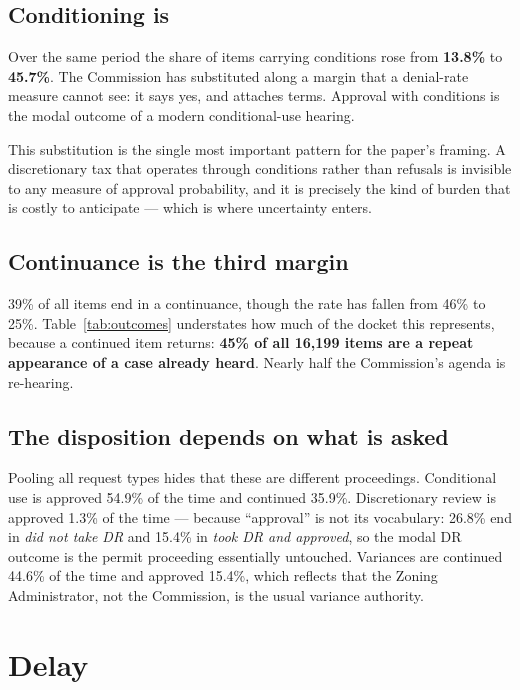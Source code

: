 \documentclass[11pt]{article}
\begin{document}
\subsection{Conditioning is}

Over the same period the share of items carrying conditions rose from \textbf{13.8\%} to
\textbf{45.7\%}. The Commission has substituted along a margin that a denial-rate measure
cannot see: it says yes, and attaches terms. Approval with conditions is the modal outcome of
a modern conditional-use hearing.

This substitution is the single most important pattern for the paper's framing. A discretionary
tax that operates through conditions rather than refusals is invisible to any measure of
approval probability, and it is precisely the kind of burden that is costly to anticipate ---
which is where uncertainty enters.

\subsection{Continuance is the third margin}

39\% of all items end in a continuance, though the rate has fallen from 46\% to 25\%.
Table~\ref{tab:outcomes} understates how much of the docket this represents, because a
continued item returns: \textbf{45\% of all 16{,}199 items are a repeat appearance of a case
already heard}. Nearly half the Commission's agenda is re-hearing.

\subsection{The disposition depends on what is asked}

Pooling all request types hides that these are different proceedings. Conditional use is
approved 54.9\% of the time and continued 35.9\%. Discretionary review is approved 1.3\% of
the time --- because ``approval'' is not its vocabulary: 26.8\% end in \emph{did not take DR}
and 15.4\% in \emph{took DR and approved}, so the modal DR outcome is the permit proceeding
essentially untouched. Variances are continued 44.6\% of the time and approved 15.4\%, which
reflects that the Zoning Administrator, not the Commission, is the usual variance authority.

\section{Delay}
\end{document}
